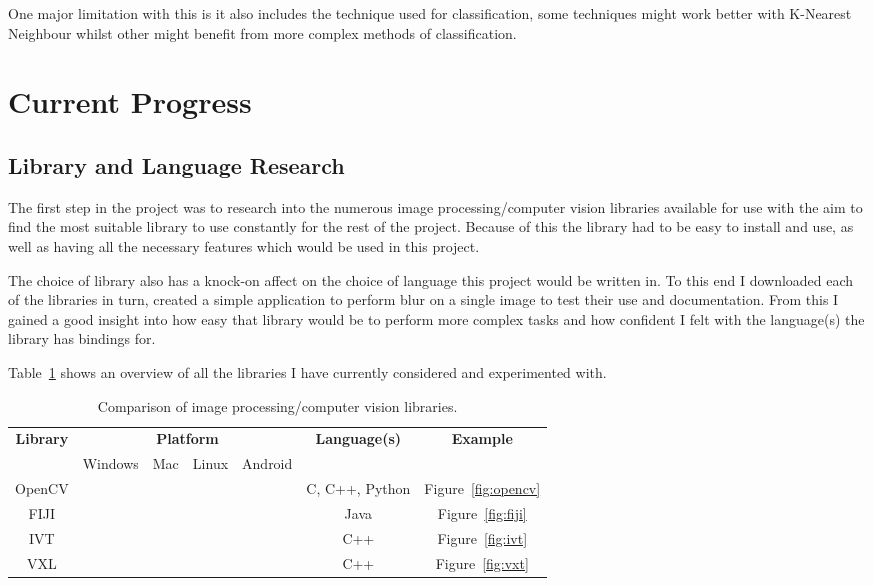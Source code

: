 \documentclass[11pt,fleqn,twoside]{article}
\begin{document}
One major limitation with this is it also includes the technique used for classification, some
techniques might work better with K-Nearest Neighbour whilst other might benefit from more complex
methods of classification.

\section{Current Progress}

\subsection{Library and Language Research}
The first step in the project was to research into the numerous image processing/computer vision
libraries available for use with the aim to find the most suitable library to use constantly for 
the rest of the project. Because of this the library had to be easy to install and use, as well as
having all the necessary features which would be used in this project.

The choice of library also has a knock-on affect on the choice of language this project would be 
written in. To this end I downloaded each of the libraries in turn, created a simple application to
 perform blur on a single image to test their use and documentation. From this I gained a good 
insight into how easy that library would be to perform more complex tasks and how confident I felt 
with the language(s) the library has bindings for.

Table~\ref{tab:libraries-overview} shows an overview of all the libraries I have currently 
considered and experimented with.

\begin{table}[h]
\begin{tabular}{| c | c | c | c | c | c | c |}
								  \hline
\multirow{2}{*}{\textbf{Library}}	& \multicolumn{4}{|c|}{\textbf{Platform}}			& \multirow{2}{*}{\textbf{Language(s)}}	& \textbf{Example}	\\\cline{2-5}
					&  Windows	& Mac 		& Linux 	& Android	&					&			\\\hline
OpenCV					& \checkmark	& \checkmark	& \checkmark	& \checkmark	& C, C++, Python			& Figure~\ref{fig:opencv}\\\hline
FIJI					& \checkmark	& \checkmark	& \checkmark	& 		& Java					& Figure~\ref{fig:fiji}	\\\hline
IVT					& \checkmark	& \checkmark	& \checkmark	& 		& C++					& Figure~\ref{fig:ivt}	\\\hline
VXL					& \checkmark	& \checkmark	& \checkmark	& 		& C++					& Figure~\ref{fig:vxt}	\\\hline
\end{tabular}
\caption{Comparison of image processing/computer vision libraries.}
\label{tab:libraries-overview}
\end{table}
\end{document}
